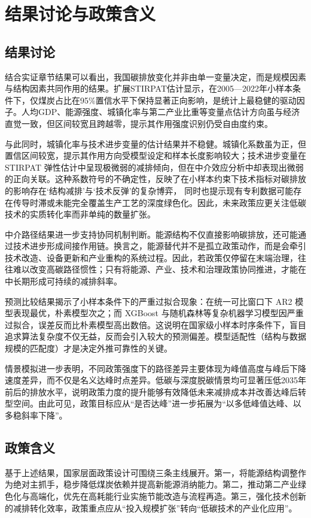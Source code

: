 \section{结果讨论与政策含义}
\subsection{结果讨论}
结合实证章节结果可以看出，我国碳排放变化并非由单一变量决定，而是规模因素与结构因素共同作用的结果。扩展STIRPAT估计显示，在2005—2022年小样本条件下，仅煤炭占比在95\%置信水平下保持显著正向影响，是统计上最稳健的驱动因子。人均GDP、能源强度、城镇化率与第二产业比重等变量点估计方向虽与经济直觉一致，但区间较宽且跨越零，提示其作用强度识别仍受自由度约束。

与此同时，城镇化率与技术进步变量的估计结果并不稳健。城镇化系数虽为正，但置信区间较宽，提示其作用方向受模型设定和样本长度影响较大；技术进步变量在 STIRPAT 弹性估计中呈现极微弱的减排倾向，但在中介效应分析中却表现出微弱的正向关联。这种系数符号的不确定性，反映了在小样本约束下技术指标对碳排放的影响存在‘结构减排’与‘技术反弹’的复杂博弈， 同时也提示现有专利数据可能存在传导时滞或未能完全覆盖生产工艺的深度绿色化。因此，未来政策应更关注低碳技术的实质转化率而非单纯的数量扩张。

中介路径结果进一步支持协同机制判断。能源结构不仅直接影响碳排放，还可能通过技术进步形成间接作用链。换言之，能源替代并不是孤立政策动作，而是会牵引技术改造、设备更新和产业重构的系统过程。因此，若政策仅停留在末端治理，往往难以改变高碳路径惯性；只有将能源、产业、技术和治理政策协同推进，才能在中长期形成可持续的减排斜率。

预测比较结果揭示了小样本条件下的严重过拟合现象：在统一可比窗口下 AR2 模型表现最优，朴素模型次之；而 XGBoost 与随机森林等复杂机器学习模型因严重过拟合，误差反而比朴素模型高出数倍。这说明在国家级小样本时序条件下，盲目追求算法复杂度不仅无益，反而会引入较大的预测偏差。模型适配性（结构与数据规模的匹配度）才是决定外推可靠性的关键。

情景模拟进一步表明，不同政策强度下的路径差异主要体现为峰值高度与峰后下降速度差异，而不仅是名义达峰时点差异。低碳与深度脱碳情景均可显著压低2035年前后的排放水平，说明政策力度的提升能够有效降低未来减排成本并改善达峰后转型空间。由此可见，政策目标应从“是否达峰”进一步拓展为“以多低峰值达峰、以多稳斜率下降”。

\subsection{政策含义}
基于上述结果，国家层面政策设计可围绕三条主线展开。第一，将能源结构调整作为绝对主抓手，稳步降低煤炭依赖并提高新能源消纳能力。第二，推动第二产业绿色化与高端化，优先在高耗能行业实施节能改造与流程再造。第三，强化技术创新的减排转化效率，政策重点应从``投入规模扩张''转向``低碳技术的产业化应用''。

